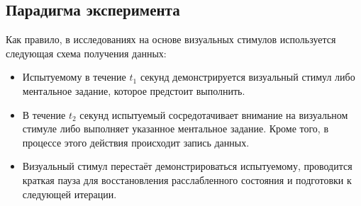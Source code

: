 \documentclass[12pt,fleqn]{article}
\begin{document}
\subsection{Парадигма эксперимента}
	\par Как правило, в исследованиях на основе визуальных стимулов используется следующая схема получения данных:
	\begin{itemize}
	\item
	Испытуемому в течение $t_1$ секунд демонстрируется визуальный стимул либо ментальное задание, которое предстоит выполнить. 
	\item
	В течение $t_2$ секунд испытуемый сосредотачивает внимание на визуальном стимуле либо выполняет указанное ментальное задание. Кроме того, в процессе этого действия происходит запись данных.
	\item Визуальный стимул перестаёт демонстрироваться испытуемому, проводится краткая пауза для восстановления расслабленного состояния и подготовки к следующей итерации.
	\end{itemize}
\end{document}
